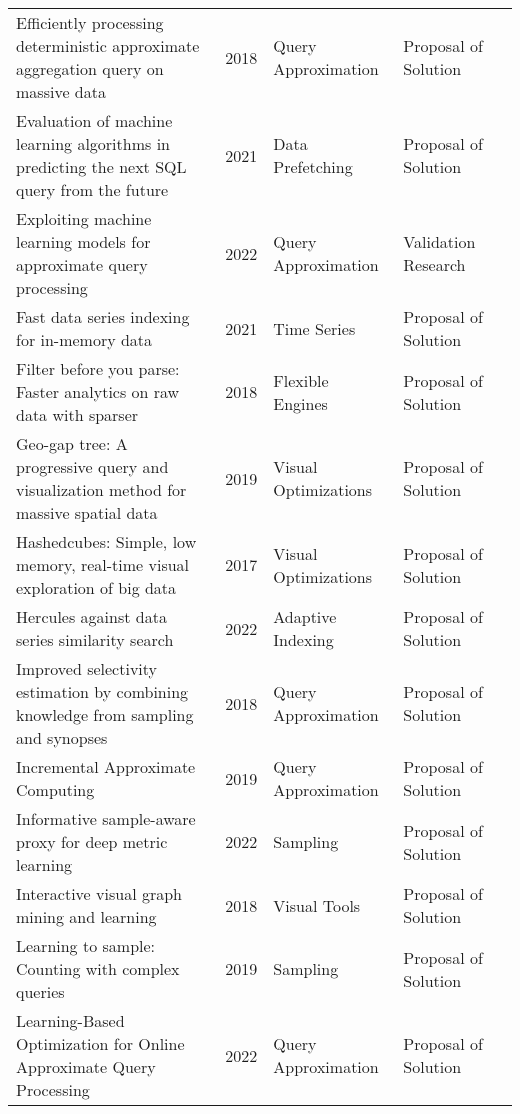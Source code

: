 \begin{longtable}{p{18em} l l l l}
Efficiently processing deterministic approximate aggregation query on massive data & 2018 & Query Approximation & Proposal of Solution & \cite{han_efficiently_2018}\\ 
Evaluation of machine learning algorithms in predicting the next {SQL} query from the future & 2021 & Data Prefetching & Proposal of Solution & \cite{10.1145/3442338}\\ 
Exploiting machine learning models for approximate query processing & 2022 & Query Approximation & Validation Research & \cite{10020252}\\ 
Fast data series indexing for in-memory data & 2021 & Time Series & Proposal of Solution & \cite{10.1007/s00778-021-00677-2}\\ 
Filter before you parse: {Faster} analytics on raw data with sparser & 2018 & Flexible Engines & Proposal of Solution & \cite{10.14778/3236187.3236207}\\ 
Geo-gap tree: {A} progressive query and visualization method for massive spatial data & 2019 & Visual Optimizations & Proposal of Solution & \cite{8765554}\\ 
Hashedcubes: {Simple}, low memory, real-time visual exploration of big data & 2017 & Visual Optimizations & Proposal of Solution & \cite{7539326}\\ 
Hercules against data series similarity search & 2022 & Adaptive Indexing & Proposal of Solution & \cite{10.14778/3547305.3547308}\\ 
Improved selectivity estimation by combining knowledge from sampling and synopses & 2018 & Query Approximation & Proposal of Solution & \cite{10.14778/3213880.3213882}\\ 
Incremental {Approximate} {Computing} & 2019 & Query Approximation & Proposal of Solution & \cite{quoc_incremental_2019}\\ 
Informative sample-aware proxy for deep metric learning & 2022 & Sampling & Proposal of Solution & \cite{10.1145/3551626.3564942}\\ 
Interactive visual graph mining and learning & 2018 & Visual Tools & Proposal of Solution & \cite{10.1145/3200764}\\ 
Learning to sample: {Counting} with complex queries & 2019 & Sampling & Proposal of Solution & \cite{10.14778/3368289.3368302}\\ 
Learning-{Based} {Optimization} for {Online} {Approximate} {Query} {Processing} & 2022 & Query Approximation & Proposal of Solution & \cite{bi_learning-based_2022}\\ 

\end{longtable}
